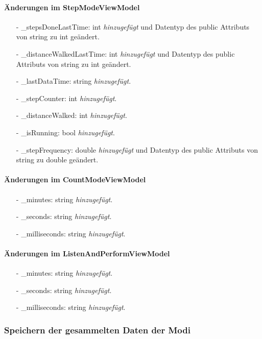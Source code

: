 \documentclass[a4paper,12pt]{article}
\begin{document}
\paragraph{Änderungen im StepModeViewModel}
\begin{itemize}
	\item[-] \_stepsDoneLastTime: int \textit{hinzugefügt} und Datentyp des public Attributs von string zu int geändert.
	\item[-] \_distanceWalkedLastTime: int \textit{hinzugefügt} und Datentyp des public Attributs von string zu int geändert.
	\item[-] \_lastDataTime: string \textit{hinzugefügt}.
	\item[-] \_stepCounter: int \textit{hinzugefügt}.
	\item[-] \_distanceWalked: int \textit{hinzugefügt}.
	\item[-] \_isRunning: bool \textit{hinzugefügt}.
	\item[-] \_stepFrequency: double \textit{hinzugefügt} und Datentyp des public Attributs von string zu double geändert.
\end{itemize}
\paragraph{Änderungen im CountModeViewModel}
\begin{itemize}
	\item[-] \_minutes: string \textit{hinzugefügt}. 
	\item[-] \_seconds: string \textit{hinzugefügt}.
	\item[-] \_milliseconds: string \textit{hinzugefügt}.
\end{itemize}
\paragraph{Änderungen im ListenAndPerformViewModel}
\begin{itemize}
	\item[-] \_minutes: string \textit{hinzugefügt}.
	\item[-] \_seconds: string \textit{hinzugefügt}.
	\item[-] \_milliseconds: string \textit{hinzugefügt}.
\end{itemize}

\subsubsection{Speichern der gesammelten Daten der Modi}
\end{document}
